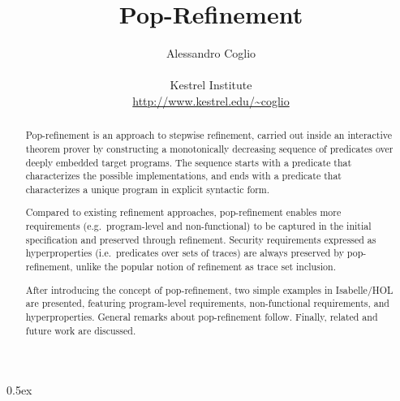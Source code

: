 \documentclass{report}
\begin{document}
\title{Pop-Refinement}

\author{Alessandro Coglio\\
        \ \\
        Kestrel Institute\\
        \url{http://www.kestrel.edu/~coglio}}

\maketitle

\begin{abstract}

\noindent
Pop-refinement is an approach to stepwise refinement,
carried out inside an interactive theorem prover
by constructing a monotonically decreasing sequence
of predicates over deeply embedded target programs.
The sequence
starts with a predicate
that characterizes the possible implementations,
and ends with a predicate
that characterizes a unique program in explicit syntactic form.

Compared to existing refinement approaches,
pop-refinement enables more requirements
(e.g.\ program-level and non-functional)
to be captured in the initial specification
and preserved through refinement.
Security requirements expressed as hyperproperties
(i.e.\ predicates over sets of traces)
are always preserved by pop-refinement,
unlike the popular notion of refinement as trace set inclusion.

After introducing the concept of pop-refinement,
two simple examples in Isabelle/HOL are presented,
featuring
program-level requirements, non-functional requirements, and hyperproperties.
General remarks about pop-refinement follow.
Finally, related and future work are discussed.

\end{abstract}

\tableofcontents

\parindent 0pt\parskip 0.5ex





\end{document}
